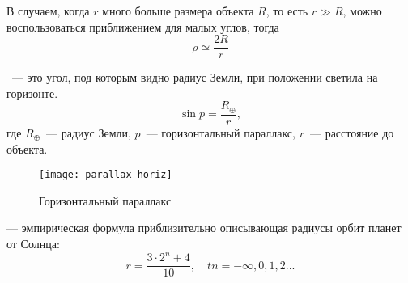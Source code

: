 В случаем, когда $r$ много больше размера объекта $R$, то есть $r\gg R$, можно воспользоваться приближением для малых углов, тогда \begin{equation}
	\rho \simeq \frac{2 R}{r}
\end{equation}

~--- это угол, под которым видно радиус Земли, при положении светила на горизонте.
\begin{equation}
\sin p=\frac{R_\oplus}{r},
\end{equation}
где $R_\oplus$~--- радиус Земли, $p$~--- горизонтальный параллакс, $r$~--- 
расстояние до объекта.

\begin{figure}[h!]
\centering
\texttt{[image: parallax-horiz]}
\caption{Горизонтальный параллакс}
\end{figure}

 --- эмпирическая формула приблизительно описывающая 
радиусы орбит планет от Солнца:
\begin{equation}r=\frac{3\cdot 2^n+4}{10}, \quad tn=-\infty, 0, 1, 2...
\end{equation}

